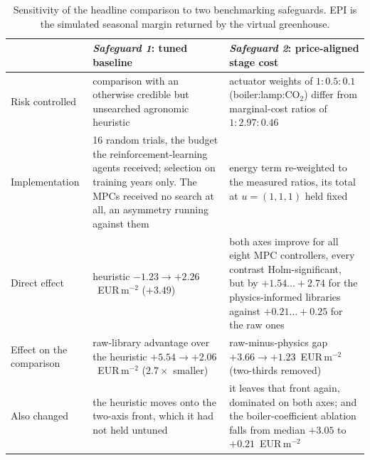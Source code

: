 \begin{table}[htbp]
\centering
\caption{Sensitivity of the headline comparison to two benchmarking safeguards.
EPI is the simulated seasonal margin returned by the virtual greenhouse.}
\label{tab:disc-defects}
\small
\begin{tabular}{lp{4.6cm}p{4.6cm}}
\toprule
 & \emph{Safeguard 1}: tuned baseline & \emph{Safeguard 2}: price-aligned stage cost \\
\midrule
Risk controlled
 & comparison with an otherwise credible but unsearched agronomic heuristic
 & actuator weights of $1:0.5:0.1$ (boiler:lamp:CO$_2$) differ from marginal-cost ratios of $1:2.97:0.46$ \\
\addlinespace
Implementation
 & 16 random trials, the budget the reinforcement-learning agents received; selection on training years only. The MPCs received no search at all, an asymmetry running against them
 & energy term re-weighted to the measured ratios, its total at $u=(1,1,1)$ held fixed \\
\addlinespace
Direct effect
 & heuristic $-1.23 \rightarrow +2.26$~EUR\,m$^{-2}$ ($+3.49$)
 & both axes improve for all eight MPC controllers, every contrast Holm-significant, but by $+1.54\ldots+2.74$ for the physics-informed libraries against $+0.21\ldots+0.25$ for the raw ones \\
\addlinespace
Effect on the comparison
 & raw-library advantage over the heuristic $+5.54 \rightarrow +2.06$~EUR\,m$^{-2}$ ($2.7\times$ smaller)
 & raw-minus-physics gap $+3.66 \rightarrow +1.23$~EUR\,m$^{-2}$ (two-thirds removed) \\
\addlinespace
Also changed
 & the heuristic moves onto the two-axis front, which it had not held untuned
 & it leaves that front again, dominated on both axes; and the boiler-coefficient ablation falls from median $+3.05$ to $+0.21$~EUR\,m$^{-2}$ \\
\bottomrule
\end{tabular}
\end{table}

